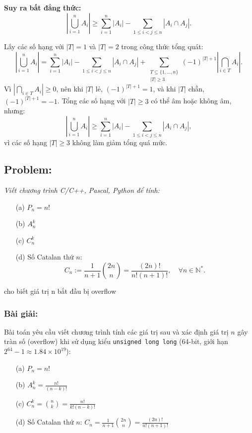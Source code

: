 \documentclass[a4paper,12pt]{article}
\begin{document}
\textbf{Suy ra bất đẳng thức:}
\[
\left| \bigcup_{i=1}^{n} A_i \right| \geq \sum_{i=1}^{n} |A_i| - \sum_{1 \leq i < j \leq n} |A_i \cap A_j|.
\]

Lấy các số hạng với $|T|=1$ và $|T|=2$ trong công thức tổng quát:
\[
\left| \bigcup_{i=1}^{n} A_i \right| = \sum_{i=1}^{n} |A_i| - \sum_{1 \leq i < j \leq n} |A_i \cap A_j| + \sum_{\substack{T \subseteq \{1, \ldots, n\} \\ |T| \geq 3}} (-1)^{|T|+1} \left| \bigcap_{i \in T} A_i \right|.
\]
Vì $\left| \bigcap_{i \in T} A_i \right| \geq 0$, nên khi $|T|$ lẻ, $(-1)^{|T|+1} = 1$, và khi $|T|$ chẵn, $(-1)^{|T|+1} = -1$. Tổng các số hạng với $|T| \geq 3$ có thể âm hoặc không âm, nhưng:
\[
\left| \bigcup_{i=1}^{n} A_i \right| \geq \sum_{i=1}^{n} |A_i| - \sum_{1 \leq i < j \leq n} |A_i \cap A_j|,
\]
vì các số hạng $|T| \geq 3$ không làm giảm tổng quá mức.

\subsection*{Problem:} \textit{Viết chương trình C/C++, Pascal, Python để tính:} 
\begin{itemize}
    \item[(a)] $P_n = n!$
    \item[(b)] $A_n^k$
    \item[(c)] $C_n^k$
    \item[(d)] Số Catalan thứ $n$:
    \[
    C_n := \frac{1}{n+1} \binom{2n}{n} = \frac{(2n)!}{n!(n+1)!}, \quad \forall n \in \mathbb{N}^*.
    \]
\end{itemize}
cho biết giá trị n bắt đầu bị overflow

\subsubsection*{Bài giải:}
Bài toán yêu cầu viết chương trình tính các giá trị sau và xác định giá trị \( n \) gây tràn số (overflow) khi sử dụng kiểu \texttt{unsigned long long} (64-bit, giới hạn \( 2^{64} - 1 \approx 1.84 \times 10^{19} \)):

\begin{itemize}
    \item[(a)] \( P_n = n! \)
    \item[(b)] \( A_n^k = \frac{n!}{(n-k)!} \)
    \item[(c)] \( C_n^k = \binom{n}{k} = \frac{n!}{k!(n-k)!} \)
    \item[(d)] Số Catalan thứ \( n \): \( C_n = \frac{1}{n+1} \binom{2n}{n} = \frac{(2n)!}{n!(n+1)!} \)
\end{itemize}
\end{document}
